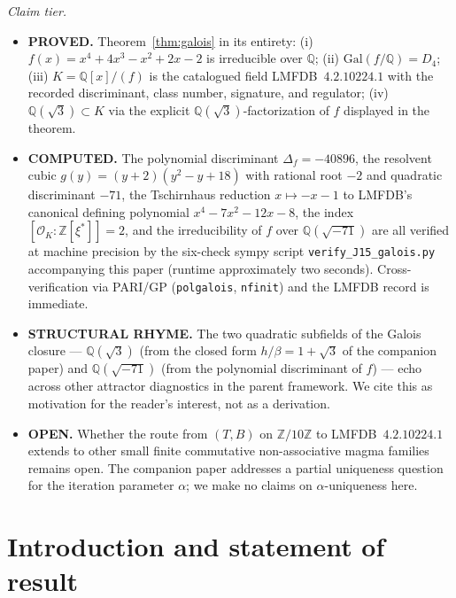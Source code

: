 \documentclass[11pt,reqno]{amsart}
\theoremstyle{plain}
\theoremstyle{definition}
\theoremstyle{remark}
\newcommand{\Q}{\mathbb{Q}}
\newcommand{\Z}{\mathbb{Z}}
\newcommand{\TS}{T}
\newcommand{\BH}{B}
\begin{document}
\medskip
\noindent\textit{Claim tier.}
\begin{itemize}\setlength\itemsep{0pt}
\item \textbf{PROVED.} Theorem~\ref{thm:galois} in its entirety: (i)
  $f(x) = x^{4} + 4x^{3} - x^{2} + 2x - 2$ is irreducible over $\Q$;
  (ii) $\mathrm{Gal}(f/\Q) = D_{4}$; (iii) $K = \Q[x]/(f)$ is the
  catalogued field LMFDB~$4.2.10224.1$ with the recorded discriminant,
  class number, signature, and regulator; (iv) $\Q(\sqrt{3}) \subset K$
  via the explicit $\Q(\sqrt{3})$-factorization of $f$ displayed in the
  theorem.

\item \textbf{COMPUTED.} The polynomial discriminant
  $\Delta_{f} = -40896$, the resolvent cubic
  $g(y) = (y+2)(y^{2} - y + 18)$ with rational root $-2$ and quadratic
  discriminant $-71$, the Tschirnhaus reduction
  $x \mapsto -x - 1$ to LMFDB's canonical defining polynomial
  $x^{4} - 7x^{2} - 12x - 8$, the index $[\mathcal{O}_{K} :
  \Z[\xi^{*}]] = 2$, and the irreducibility of $f$ over $\Q(\sqrt{-71})$
  are all verified at machine precision by the six-check sympy script
  \texttt{verify\_J15\_galois.py} accompanying this paper (runtime
  approximately two seconds). Cross-verification via PARI/GP
  (\texttt{polgalois}, \texttt{nfinit}) and the LMFDB record is
  immediate.

\item \textbf{STRUCTURAL RHYME.} The two quadratic subfields of the
  Galois closure --- $\Q(\sqrt{3})$ (from the closed form
  $h/\beta = 1+\sqrt{3}$ of the companion paper) and $\Q(\sqrt{-71})$
  (from the polynomial discriminant of $f$) --- echo across other
  attractor diagnostics in the parent framework. We cite this as
  motivation for the reader's interest, not as a derivation.

\item \textbf{OPEN.} Whether the route from $(\TS, \BH)$ on $\Z/10\Z$
  to LMFDB~$4.2.10224.1$ extends to other small finite commutative
  non-associative magma families remains open. The companion paper
  \cite{SandersGishFourCore} addresses a partial uniqueness question
  for the iteration parameter $\alpha$; we make no claims on
  $\alpha$-uniqueness here.
\end{itemize}

\section{Introduction and statement of result}
\end{document}
